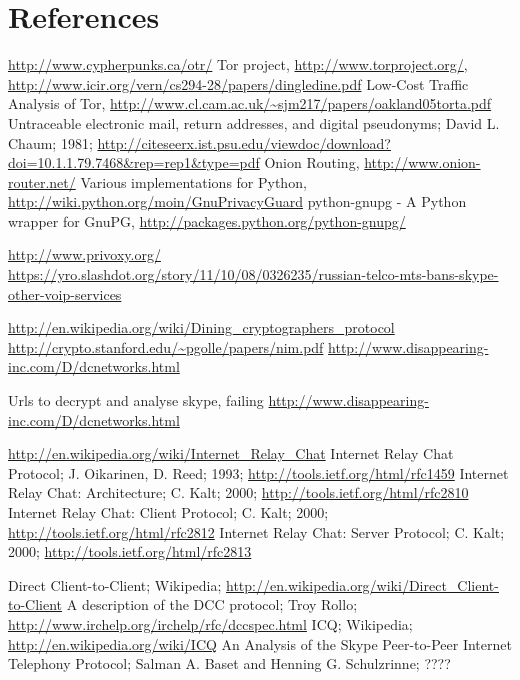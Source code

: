 \section{References}
\begin{thebibliography}{666}
 \url{http://www.cypherpunks.ca/otr/}
 Tor project, \url{http://www.torproject.org/},
    \url{http://www.icir.org/vern/cs294-28/papers/dingledine.pdf}
 Low-Cost Traffic Analysis of Tor,
    \url{http://www.cl.cam.ac.uk/~sjm217/papers/oakland05torta.pdf}
 Untraceable electronic mail, return addresses, and digital pseudonyms;
    David L. Chaum; 1981;
    \url{http://citeseerx.ist.psu.edu/viewdoc/download?doi=10.1.1.79.7468&rep=rep1&type=pdf}
 Onion Routing, \url{http://www.onion-router.net/}
 Various implementations for Python,
    \url{http://wiki.python.org/moin/GnuPrivacyGuard}
 python-gnupg - A Python wrapper for GnuPG,
    \url{http://packages.python.org/python-gnupg/}

 \url{http://www.privoxy.org/}
\url{https://yro.slashdot.org/story/11/10/08/0326235/russian-telco-mts-bans-skype-other-voip-services}

\url{http://en.wikipedia.org/wiki/Dining_cryptographers_protocol}
\url{http://crypto.stanford.edu/~pgolle/papers/nim.pdf}
\url{http://www.disappearing-inc.com/D/dcnetworks.html}

 Urls to decrypt and analyse skype, failing
\url{http://www.disappearing-inc.com/D/dcnetworks.html}

 \url{http://en.wikipedia.org/wiki/Internet_Relay_Chat}
 Internet Relay Chat Protocol; J. Oikarinen, D. Reed; 1993;
    \url{http://tools.ietf.org/html/rfc1459}
 Internet Relay Chat: Architecture; C. Kalt; 2000;
    \url{http://tools.ietf.org/html/rfc2810}
 Internet Relay Chat: Client Protocol; C. Kalt; 2000;
    \url{http://tools.ietf.org/html/rfc2812}
 Internet Relay Chat: Server Protocol; C. Kalt; 2000;
    \url{http://tools.ietf.org/html/rfc2813}

 Direct Client-to-Client; Wikipedia;
    \url{http://en.wikipedia.org/wiki/Direct_Client-to-Client}
 A description of the DCC protocol; Troy Rollo;
    \url{http://www.irchelp.org/irchelp/rfc/dccspec.html}
 ICQ; Wikipedia;
    \url{http://en.wikipedia.org/wiki/ICQ}
 An Analysis of the Skype Peer-to-Peer Internet
Telephony Protocol;
Salman A. Baset and Henning G. Schulzrinne;
????


\end{thebibliography}

